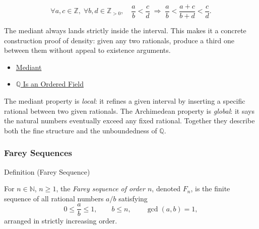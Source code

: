 \begin{remark*}
\[
\forall a,c \in \mathbb{Z},\; \forall b,d \in \mathbb{Z}_{>0},\quad
\frac{a}{b} < \frac{c}{d}
\;\Longrightarrow\;
\frac{a}{b} < \frac{a+c}{b+d} < \frac{c}{d}.
\]
\end{remark*}

\begin{remark*}[Interpretation]
The mediant always lands strictly inside the interval.  This makes it a
concrete construction proof of density: given any two rationals, produce
a third one between them without appeal to existence arguments.
\end{remark*}

\begin{dependencies}
\begin{itemize}
  \item \hyperref[def:mediant]{Mediant}
  \item \hyperref[thm:q-is-ordered-field]{$\mathbb{Q}$ Is an Ordered Field}
\end{itemize}
\end{dependencies}

\begin{remark*}
\label{rem:mediant-vs-arch}
The mediant property is \emph{local}: it refines a given interval by
inserting a specific rational between two given rationals.
The Archimedean property is \emph{global}: it says the natural numbers
eventually exceed any fixed rational.
Together they describe both the fine structure and the unboundedness of
$\mathbb{Q}$.
\end{remark*}

\subsubsection*{Farey Sequences}

\begin{definitionbox}{Definition (Farey Sequence)}
\begin{definition}
\label{def:farey-sequence}
For $n \in \mathbb{N}$, $n \geq 1$, the \emph{Farey sequence of order $n$},
denoted $F_n$, is the finite sequence of all rational numbers $a/b$ satisfying
\[
0 \leq \frac{a}{b} \leq 1, \qquad b \leq n, \qquad \gcd(a,b) = 1,
\]
arranged in strictly increasing order.
\end{definition}
\end{definitionbox}

